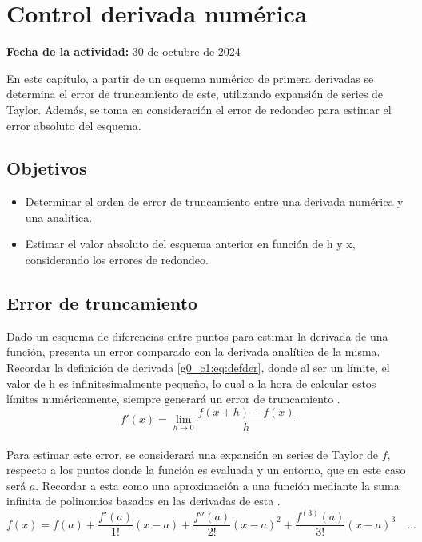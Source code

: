 \documentclass[../portafolio.tex]{subfiles}
\begin{document}
\chapter{Control derivada numérica}
\label{g0_c1}
\hfill \textbf{Fecha de la actividad:} 30 de octubre de 2024

\medskip

En este capítulo, a partir de un esquema numérico de primera derivadas se determina el error de truncamiento de este, utilizando expansión de series de Taylor. Además, se toma en consideración el error de redondeo para estimar el error absoluto del esquema.

\section*{Objetivos}
\begin{itemize}
\item Determinar el orden de error de truncamiento entre una derivada numérica y una analítica.
\item Estimar el valor absoluto del esquema anterior en función de h y x, considerando los errores de redondeo.
\end{itemize}

\section{Error de truncamiento}
Dado un esquema de diferencias entre puntos para estimar la derivada de una función, presenta un error comparado con la derivada analítica de la misma. Recordar la definición de derivada \eqref{g0_c1:eq:defder}, donde al ser un límite, el valor de h es infinitesimalmente pequeño, lo cual a la hora de calcular estos límites numéricamente, siempre generará un error de truncamiento \citep{navarro2024errores}.
\begin{equation}\label{g0_c1:eq:defder}
f'(x)=\lim_{h\rightarrow 0}\frac{f(x+h)-f(x)}{h}
\end{equation}
\\
Para estimar este error, se considerará una expansión en series de Taylor de $f$, respecto a los puntos donde la función es evaluada y un entorno, que en este caso será $a$. Recordar a esta como una aproximación a una función mediante la suma infinita de polinomios basados en las derivadas de esta \citep{Stewart2001}.
\begin{equation}\label{g0_c1:eq:series_de_Taylor}
f(x)=f(a)+\frac{f'(a)}{1!}(x-a)+ \frac{f''(a)}{2!}(x-a)^2+\frac{f^{(3)}(a)}{3!}(x-a)^3\quad ...
\end{equation}
\end{document}
